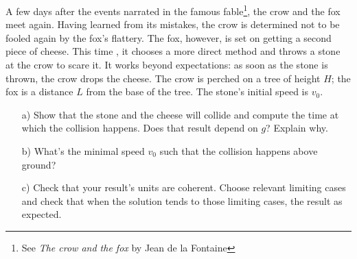 %
%

\begin{center}
\vspace*{5mm}
\end{center}


A few days after the events narrated in the famous fable\footnote{See \textit{The crow and the fox} by Jean de la Fontaine}, the crow and the fox meet again. Having learned from its mistakes, the crow is determined not to be fooled again by the fox's flattery. The fox, however, is set on getting a second piece of cheese. This time , it chooses a more direct method and throws a stone at the crow to scare it. It works beyond expectations: as soon as the stone is thrown, the crow drops the cheese.
The crow is perched on a tree of height $H$; the fox is a distance $L$ from the base of the tree. The stone's initial speed is $v_0$.
\begin{enumerate}
\item[a)] Show that the stone and the cheese will collide and compute the time at which the collision happens. Does that result depend on $g$? Explain why.
\item[b)] What's the minimal speed $v_0$ such that the collision happens above ground?
\item[c)] Check that your result's units are coherent. Choose relevant limiting cases and check that when the solution tends to those limiting cases, the result as expected.
\end{enumerate}

\begin{center}

\end{center}
